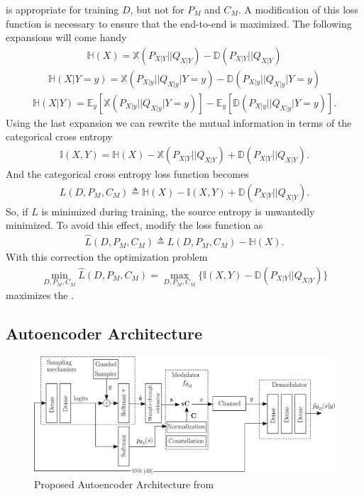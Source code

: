 is appropriate for training $D$, but not for $P_M$ and $C_M$. A modification of this loss function is necessary to ensure that the end-to-end  is maximized. The following expansions will come handy
\begin{align}
	\mathbb{H}(X) = \mathbb{X}(P_{X|Y}||Q_{X|Y}) - \mathbb{D}(P_{X|Y}||Q_{X|Y})
\end{align}
\begin{align}
	\mathbb{H}(X|Y=y) = \mathbb{X}(P_{X|y}||Q_{X|y}|Y=y) - \mathbb{D}(P_{X|y}||Q_{X|y}|Y=y)
\end{align}
\begin{align}
	\mathbb{H}(X|Y) = \mathbb{E}_y\left[\mathbb{X}(P_{X|y}||Q_{X|y}|Y=y)\right] - \mathbb{E}_y \left[\mathbb{D}(P_{X|y}||Q_{X|y}|Y=y)\right].
\end{align}
Using the last expansion we can rewrite the mutual information in terms of the categorical cross entropy
\begin{align}
	\mathbb{I} \left(X , Y\right) = \mathbb{H}(X) - \mathbb{X}(P_{X|Y}||Q_{X|Y}) + \mathbb{D}(P_{X|Y}||Q_{X|Y}).
\end{align}
And the categorical cross entropy loss function becomes 
\begin{align}
	L(D, P_M, C_M) \triangleq \mathbb{H}(X) - \mathbb{I} \left(X , Y\right) + \mathbb{D}(P_{X|Y}||Q_{X|Y}).
\end{align}
So, if $L$ is minimized during training, the source entropy is unwantedly minimized. To avoid this effect, \citeauthor{Stark} modify the loss function as
\begin{align}
	\hat{L}(D, P_M, C_M) \triangleq L(D, P_M, C_M) - \mathbb{H}(X).
\end{align}
With this correction the optimization problem 
\begin{align}
	\min_{D, P_M, C_M}\hat{L}(D, P_M, C_M) = \max_{D, P_M, C_M} \{ \mathbb{I} \left(X , Y\right) - \mathbb{D}(P_{X|Y}||Q_{X|Y})\}
\end{align}
maximizes the .
\subsection{Autoencoder Architecture}

\begin{figure}[H]
	\includegraphics[width=\textwidth]{figs/stark_diagram.pdf}
	\centering	
	\caption{Proposed Autoencoder Architecture from \cite{Stark}}
	\label{fig:starkAe}
\end{figure}

